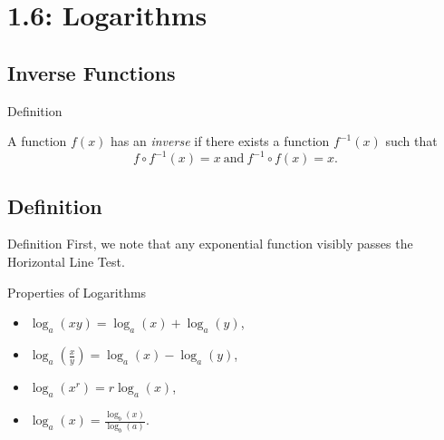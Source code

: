 \documentclass[Lecture.tex]{subfiles}
\begin{document}
\section{1.6: Logarithms}

\subsection{Inverse Functions}

\begin{frame}{Definition}
  \begin{defn}
    A function $f(x)$ has an {\it inverse} if there exists a function $f^{-1}(x)$ such that
    $$f \circ f^{-1}(x) = x\ \text{and}\ f^{-1} \circ f(x) = x.$$
  \end{defn}
  
\end{frame}

\subsection{Definition}

\begin{frame}{Definition}
  First, we note that any exponential function visibly passes the Horizontal Line Test.
\end{frame}

\begin{frame}{Properties of Logarithms}
\begin{itemize}
  \item<1->
    $\log_a(xy) = \log_a(x) + \log_a(y)$,
  \item<2->
    $\log_a\left(\frac{x}{y}\right) = \log_a(x) - \log_a(y)$,
  \item<3->
    $\log_a\left(x^r\right) = r\log_a(x)$,
  \item<4->
    $\log_a(x) = \frac{\log_b(x)}{\log_b(a)}$.
\end{itemize}
\end{frame}
\end{document}
